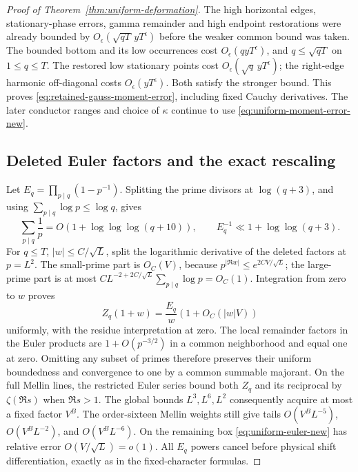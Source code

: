 \begin{proof}[Proof of Theorem~\ref{thm:uniform-deformation}]
The high horizontal edges, stationary-phase errors, gamma remainder
and high endpoint restorations were already bounded by
$O_\epsilon(\sqrt{qT}\,yT^\epsilon)$ before the weaker common
bound was taken. The bounded bottom and its low occurrences cost
$O_\epsilon(qyT^\epsilon)$, and $q\le\sqrt{qT}$ on $1\le q\le T$.
The restored low stationary points cost
$O_\epsilon(\sqrt q\,yT^\epsilon)$; the right-edge harmonic
off-diagonal costs $O_\epsilon(yT^\epsilon)$. Both satisfy the
stronger bound. This proves \eqref{eq:retained-gauss-moment-error},
including fixed Cauchy derivatives. The later conductor ranges and
choice of $\kappa$ continue to use \eqref{eq:uniform-moment-error-new}.

\subsection{Deleted Euler factors and the exact rescaling}
Let $E_q=\prod_{p\mid q}(1-p^{-1})$. Splitting the prime divisors
at $\log(q+3)$, and using $\sum_{p\mid q}\log p\le\log q$, gives
\[
 \sum_{p\mid q}\frac1p=O(1+\log\log\log(q+10)),\qquad
 E_q^{-1}\ll1+\log\log(q+3).
\]
For $q\le T$, $|w|\le C/\sqrt L$, split the logarithmic derivative
of the deleted factors at $p=L^2$. The small-prime part is $O_C(V)$,
because $p^{|\Re w|}\le e^{2CV/\sqrt L}$; the large-prime part is
at most $CL^{-2+2C/\sqrt L}\sum_{p\mid q}\log p=O_C(1)$.
Integration from zero to $w$ proves
\begin{equation}\label{eq:uniform-euler-new}
                Z_q(1+w)=\frac{E_q}{w}(1+O_C(|w|V))
\end{equation}
uniformly, with the residue interpretation at zero.
The local remainder factors in the Euler products are
$1+O(p^{-3/2})$ in a common neighborhood and equal one at zero.
Omitting any subset of primes therefore preserves their uniform
boundedness and convergence to one by a common summable majorant.
On the full Mellin lines, the restricted Euler series bound both
$Z_q$ and its reciprocal by $\zeta(\Re s)$ when $\Re s>1$.
The global bounds $L^3,L^6,L^2$ consequently acquire at most a
fixed factor $V^B$. The order-sixteen Mellin weights still give
tails $O(V^BL^{-5})$, $O(V^BL^{-2})$, and $O(V^BL^{-6})$.
On the remaining box \eqref{eq:uniform-euler-new} has relative
error $O(V/\sqrt L)=o(1)$. All $E_q$ powers cancel before physical
shift differentiation, exactly as in the fixed-character formulas.


\end{proof}
